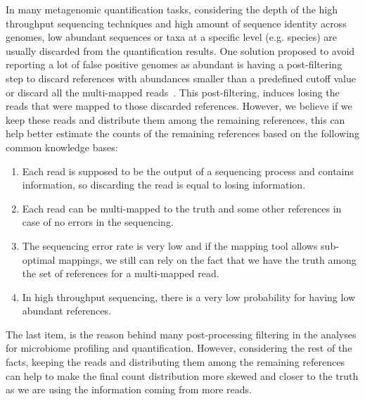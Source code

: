 In many metagenomic quantification tasks,
considering the depth of the high throughput sequencing techniques
and high amount of sequence identity across genomes,
low abundant sequences or taxa at a specific level (e.g. species)
are usually discarded from the quantification results.
One solution proposed to avoid reporting a lot of false positive genomes as abundant
is having a post-filtering step
to discard references with abundances smaller than a predefined cutoff value
or discard all the multi-mapped reads~\cite{bracken,karp}.
This post-filtering, induces losing the reads that were mapped to those discarded references.
However, we believe if we keep these reads and distribute them among the remaining references,
this can help better estimate the counts of the remaining references
based on the following common knowledge bases:
\begin{enumerate}
    \item Each read is supposed to be the output of a sequencing process and contains information,
    so discarding the read is equal to losing information.
    \item Each read can be multi-mapped to the truth and some other references
    in case of no errors in the sequencing.
    \item The sequencing error rate is very low and if the mapping tool allows sub-optimal mappings,
    we still can rely on the fact that we have the truth
    among the set of references for a multi-mapped read.
    \item In high throughput sequencing, there is a very low probability for having low abundant references.
\end{enumerate}
The last item, is the reason behind many post-processing filtering in the analyses for microbiome profiling
and quantification.
However, considering the rest of the facts, keeping the reads and
distributing them among the remaining references
can help to make the final count distribution more skewed and closer to the truth
as we are using the information coming from more reads.


